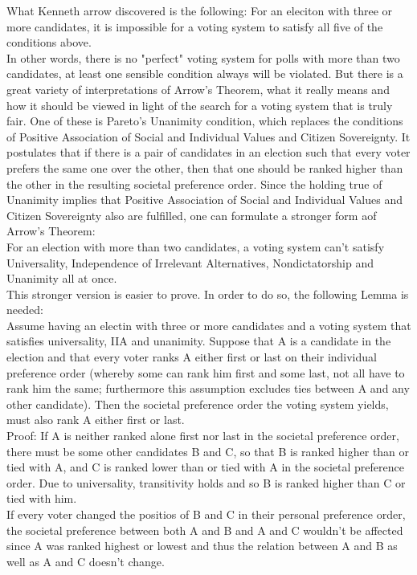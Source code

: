 What Kenneth arrow discovered is the following: For an eleciton with three or more candidates, it is impossible for a voting system to satisfy all five of the conditions above. \\
In other words, there is no "perfect" voting system for polls with more than two candidates, at least one sensible condition always will be violated. But there is a great variety of interpretations of Arrow's Theorem, what it really means and how it should be viewed in light of the search for a voting system that is truly fair. 
One of these is Pareto's Unanimity condition, which replaces the conditions of Positive Association of Social and Individual Values and Citizen Sovereignty. It postulates that if there is a pair of candidates in an election such that every voter prefers the same one over the other, then that one should be ranked higher than the other in the resulting societal preference order. 
Since the holding true of Unanimity implies that Positive Association of Social and Individual Values and Citizen Sovereignty also are fulfilled, one can formulate a stronger form aof Arrow's Theorem: \\
For an election with more than two candidates, a voting system can't satisfy Universality, Independence of Irrelevant Alternatives, Nondictatorship and Unanimity all at once. \\
This stronger version is easier to prove. In order to do so, the following Lemma is needed: \\
Assume having an electin with three or more candidates and a voting system that satisfies universality, IIA and unanimity. Suppose that A is a candidate in the election and that every voter ranks A either first or last on their individual preference order (whereby some can rank him first and some last, not all have to rank him the same; furthermore this assumption excludes ties between A and any other candidate). Then the societal preference order the voting system yields, must also rank A either first or last. \\
Proof: If A is neither ranked alone first nor last in the societal preference order, there must be some other candidates B and C, so that B is ranked higher than or tied with A, and C is ranked lower than or tied with A in the societal preference order. 
Due to universality, transitivity holds and so B is ranked higher than C or tied with him. \\
If every voter changed the positios of B and C in their personal preference order, the societal preference between both A and B and A and C wouldn't be affected since A was ranked highest or lowest and thus the relation between A and B as well as A and C doesn't change. 



